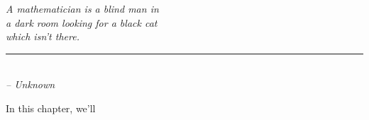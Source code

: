 \begin{flushleft}
	\textsl{A mathematician is a blind man in }\\
	\textsl{a dark room looking for a black cat}\\
	\textsl{which isn’t there.}\\
	\rule[0pt]{15em}{0.5pt}\\
	\textsl{-- Unknown}
	\vspace{2em}
\end{flushleft}

In this chapter, we'll

%
%
%
%
%
%
